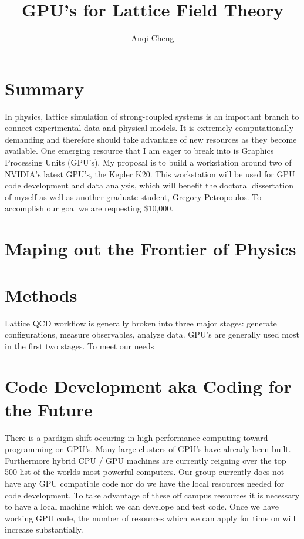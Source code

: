 \documentclass[11pt]{article}
\begin{document}
  \title{GPU's for Lattice Field Theory}
  \author{Anqi Cheng}
  \maketitle

   \section*{Summary} %
   In physics, lattice simulation of strong-coupled systems is an important branch to connect experimental data and physical models.
   It is extremely computationally demanding and therefore should take advantage of new  resources as they become available.
   One emerging resource that I am eager to break into is Graphics Processing Units (GPU's).   
   My proposal is to build a workstation around two of NVIDIA's latest GPU's, the Kepler K20.  
   This workstation will be used for GPU code development and data analysis, which will benefit the doctoral dissertation of myself as well as another graduate student, Gregory Petropoulos.  
   To accomplish our goal we are requesting \$10,000.  
 
  \section*{Maping out the Frontier of Physics} %

  \section*{Methods} %
  Lattice QCD workflow is generally broken into three major stages:  generate configurations, measure observables, analyze data.
  GPU's are generally used most in the first two stages.  
  To meet our needs 

  
  
  \section*{Code Development aka Coding for the Future} %
  There is a pardigm shift occuring in high performance computing toward programming on GPU's.  
  Many large clusters of GPU's have already been built.
  Furthermore hybrid CPU / GPU machines are currently reigning over the top 500 list of the worlds most powerful computers.
  Our group currently does not have any GPU compatible code nor do we have the local resources needed for code development.  
  To take advantage of these off campus resources it is necessary to have a local machine which we can develope and test code.
  Once we have working GPU code, the number of resources which we can apply for time on will increase substantially.
\end{document}
